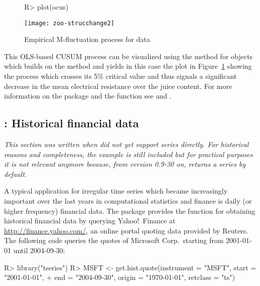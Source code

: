\documentclass[article,nojss]{jss}
\begin{document}
\begin{figure}[h!]
\begin{center}
\begin{Schunk}
\begin{Sinput}
R> plot(ocus)
\end{Sinput}
\end{Schunk}
\texttt{[image: zoo-strucchange2]}
\caption{\label{fig:strucchange} Empirical M-fluctuation process for  data}
\end{center}
\end{figure}

This OLS-based CUSUM process can be visualized using the  method
for  objects which builds on the  method and yields in
this case the plot in Figure~\ref{fig:strucchange} showing the process which
crosses its 5\% critical value and 
thus signals a significant decrease in the mean electrical resistance over the
juice content. For more information on the package  and the 
function  see \cite{zoo:Zeileis+Leisch+Hornik:2002} and 
\cite{zoo:Zeileis:2005}.


\subsection[tseries: Historical financial data]{: Historical financial data}
\label{sec:tseries}

\emph{This section was written when  did not yet support 
series directly. For historical reasons and completeness, the example is still
included but for practical purposes it is not relevant anymore because,
from version 0.9-30 on,  returns a  series by default.}

A typical application for irregular time series which became increasingly
important over the last years in computational statistics and finance is
daily (or higher frequency) financial data. The package  provides
the function  for obtaining historical financial data
by querying Yahoo!\ Finance at \url{http://finance.yahoo.com/},
an online portal quoting data provided by Reuters. The following code
queries the quotes of Microsoft Corp.\ starting from 2001-01-01
until 2004-09-30:

\begin{Schunk}
\begin{Sinput}
R> library("tseries")
R> MSFT <- get.hist.quote(instrument = "MSFT", start = "2001-01-01", 
+     end = "2004-09-30", origin = "1970-01-01", retclass = "ts")
\end{Sinput}
\end{Schunk}
\end{document}
